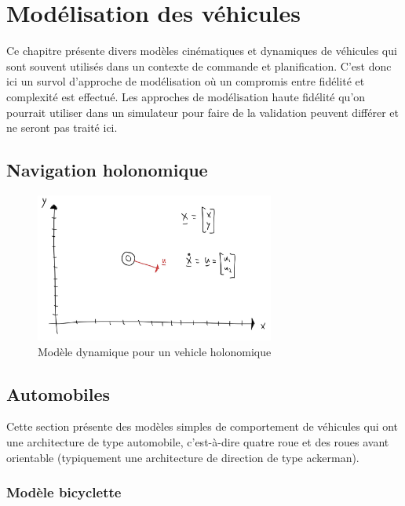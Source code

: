 \chapter{Modélisation des véhicules}

Ce chapitre présente divers modèles cinématiques et dynamiques de véhicules qui sont souvent utilisés dans un contexte de commande et planification. C'est donc ici un survol d'approche de modélisation où un compromis entre fidélité et complexité est effectué. Les approches de modélisation haute fidélité qu'on pourrait utiliser dans un simulateur pour faire de la validation peuvent différer et ne seront pas traité ici.


\section{Navigation holonomique}

\begin{figure}[htbp]
	\centering
		\includegraphics[width=0.70\textwidth]{fig/holonomicvehicle.jpg}
	\caption{Modèle dynamique pour un vehicle holonomique}
	\label{fig:holonomicvehicle}
\end{figure}



\section{Automobiles}

Cette section présente des modèles simples de comportement de véhicules qui ont une architecture de type automobile, c'est-à-dire quatre roue et des roues avant orientable (typiquement une architecture de direction de type ackerman).

\subsection{Modèle bicyclette}

